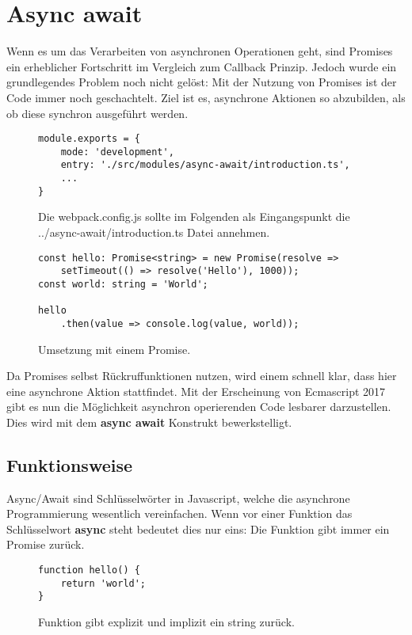 \section{Async await}
Wenn es um das Verarbeiten von asynchronen Operationen geht, sind Promises ein erheblicher Fortschritt im Vergleich zum Callback Prinzip. Jedoch wurde ein grundlegendes Problem noch nicht gelöst: Mit der Nutzung von Promises ist der Code immer noch geschachtelt. Ziel ist es, asynchrone Aktionen so abzubilden, als ob diese synchron ausgeführt werden. 

\begin{figure}[H]
\begin{lstlisting}[basicstyle=\small]
module.exports = {
    mode: 'development',
    entry: './src/modules/async-await/introduction.ts',
    ...
}
\end{lstlisting}
\caption{Die webpack.config.js sollte im Folgenden als Eingangspunkt die ../async-await/introduction.ts Datei annehmen.}
\end{figure}

\begin{figure}[H]
\begin{lstlisting}[basicstyle=\small]
const hello: Promise<string> = new Promise(resolve =>
    setTimeout(() => resolve('Hello'), 1000));
const world: string = 'World';

hello
    .then(value => console.log(value, world));
\end{lstlisting}
\caption{Umsetzung mit einem Promise.}
\label{Promise-comparison-async-await}
\end{figure}

\noindent
Da Promises selbst Rückruffunktionen nutzen, wird einem schnell klar, dass hier eine asynchrone Aktion stattfindet. Mit der Erscheinung von Ecmascript 2017 gibt es nun die Möglichkeit asynchron operierenden Code lesbarer darzustellen. Dies wird mit dem \textbf{async await} Konstrukt bewerkstelligt. 

\subsection{Funktionsweise}

Async/Await sind Schlüsselwörter in Javascript, welche die asynchrone Programmierung wesentlich vereinfachen. Wenn vor einer Funktion das Schlüsselwort \textbf{async} steht bedeutet dies nur eins: Die Funktion gibt immer ein Promise zurück.

\begin{figure}[H]
\begin{lstlisting}[basicstyle=\small]
function hello() {
    return 'world';
}
\end{lstlisting}
\caption{Funktion gibt explizit und implizit ein string zurück.}
\end{figure}

